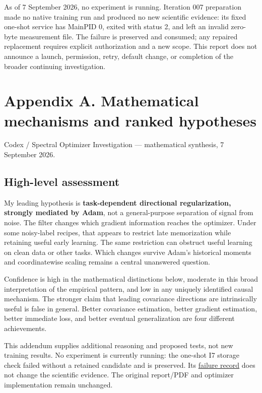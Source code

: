 \documentclass[
  british,
  10pt,
  a4paper,
]{article}
\begin{document}
As of 7 September 2026, no experiment is running. Iteration 007
preparation made no native training run and produced no new scientific
evidence: its fixed one-shot service has MainPID 0, exited with status
2, and left an invalid zero-byte measurement file. The failure is
preserved and consumed; any repaired replacement requires explicit
authorization and a new scope. This report does not announce a launch,
permission,\allowbreak{} retry, default change, or completion of the
broader continuing investigatio\allowbreak{}n.\allowbreak{}

\clearpage

\section{Appendix A. Mathematical mechanisms and ranked
hypotheses}\label{mathematics}

Codex / Spectral Optimizer Investigation --- mathematical synthesis, 7
September 2026.

\subsection{High-level
assessment}\label{mathematics--high-level-assessment}

My leading hypothesis is \textbf{task-\allowbreak{}dependent directional
regularizati\allowbreak{}on,\allowbreak{} strongly mediated by Adam},
not a general-\allowbreak{}purpose separation of signal from noise. The
filter changes which gradient information reaches the optimizer. Under
some noisy-\allowbreak{}label recipes, that appears to restrict late
memorization while retaining useful early learning. The same restriction
can obstruct useful learning on clean data or other tasks. Which changes
survive Adam's historical moments and coordinatewise scaling remains a
central unanswered question.

Confidence is high in the mathematical distinctions below, moderate in
this broad interpretation of the empirical pattern, and low in any
uniquely identified causal mechanism. The stronger claim that leading
covariance directions are intrinsically useful is false in general.
Better covariance estimation,\allowbreak{} better gradient
estimation,\allowbreak{} better immediate loss, and better eventual
generalization are four different
achievements\allowbreak{}.\allowbreak{}

This addendum supplies additional reasoning and proposed tests, not new
training results. No experiment is currently running: the one-shot I7
storage check failed without a retained candidate and is preserved. Its
\href{../continuation/iteration-007/native-storage-measurement-failure-review.md}{failure
record} does not change the scientific evidence. The original report/PDF
and optimizer implementation remain unchanged.
\end{document}
